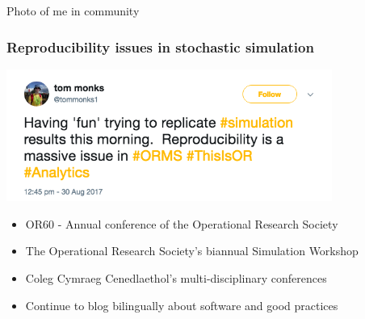 \documentclass{beamer}
\begin{document}
\begin{frame}
Photo of me in community
\end{frame}

\begin{frame}
  \frametitle{Reproducibility issues in stochastic simulation}
  \begin{center}
    \includegraphics[width=0.8\textwidth]{reproducibility_tweet}
  \end{center}
\end{frame}

\begin{frame}
  \begin{itemize}
    \setlength\itemsep{3em}
    \item OR60 - Annual conference of the Operational Research Society
    \item The Operational Research Society's biannual Simulation Workshop
    \item Coleg Cymraeg Cenedlaethol's multi-disciplinary conferences
    \item Continue to blog bilingually about software and good practices
  \end{itemize}
\end{frame}
\end{document}
